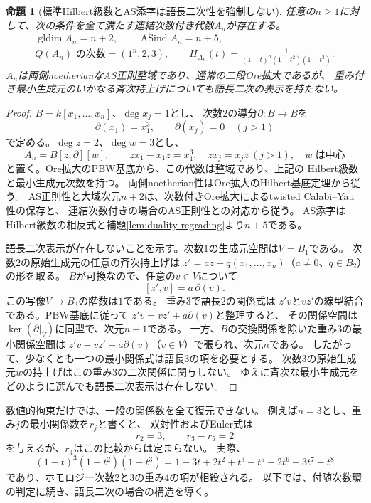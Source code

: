 \documentclass[11pt,a4paper]{ltjsarticle}
\newtheorem{proposition}[theorem]{命題}
\theoremstyle{definition}
\newcommand{\gldim}{\operatorname{gldim}}
\begin{document}
\begin{proposition}[標準Hilbert級数とAS添字は語長二次性を強制しない]\label{prop:nonquadratic-ore-family}
任意の$n\ge1$に対して、次の条件を全て満たす連結次数付き代数$A_n$が存在する。
\[
\begin{gathered}
\gldim A_n=n+2,\qquad \operatorname{ASind}A_n=n+5,\\
Q(A_n)\text{ の次数}=(1^n,2,3),\qquad
H_{A_n}(t)=\frac1{(1-t)^n(1-t^2)(1-t^3)}.
\end{gathered}
\]
$A_n$は両側noetherianなAS正則整域であり、通常の二段Ore拡大であるが、
重み付き最小生成元のいかなる斉次持上げについても語長二次の表示を持たない。
\end{proposition}
\begin{proof}
$B=k[x_1,\ldots,x_n]$、$\deg x_j=1$とし、
次数$2$の導分$\partial:B\to B$を
\[
\partial(x_1)=x_1^3,\qquad \partial(x_j)=0\quad(j>1)
\]
で定める。$\deg z=2$、$\deg w=3$とし、
\[
A_n=B[z;\partial][w],\qquad
zx_1-x_1z=x_1^3,\quad zx_j=x_jz\ (j>1),\quad w\text{ は中心}
\]
と置く。Ore拡大のPBW基底から、この代数は整域であり、上記の
Hilbert級数と最小生成元次数を持つ。
両側noetherian性はOre拡大のHilbert基底定理から従う。
AS正則性と大域次元$n+2$は、次数付きOre拡大によるtwisted
Calabi--Yau性の保存\cite[Theorem 3.3]{LWW}と、
連結次数付きの場合のAS正則性との対応から従う。
AS添字はHilbert級数の相反式と補題\ref{lem:duality-regrading}より$n+5$である。

語長二次表示が存在しないことを示す。次数$1$の生成元空間は$V=B_1$である。
次数$2$の原始生成元の任意の斉次持上げは
$z'=az+q(x_1,\ldots,x_n)$（$a\ne0$、$q\in B_2$）の形を取る。
$B$が可換なので、任意の$v\in V$について
\[
[z',v]=a\,\partial(v).
\]
この写像$V\to B_3$の階数は$1$である。
重み$3$で語長$2$の関係式は
$z'v$と$vz'$の線型結合である。PBW基底に従って
$z'v=vz'+a\partial(v)$と整理すると、
その関係空間は$\ker(\partial|_V)$に同型で、次元$n-1$である。
一方、$B$の交換関係を除いた重み$3$の最小関係空間は
$z'v-vz'-a\partial(v)$（$v\in V$）で張られ、次元$n$である。
したがって、少なくとも一つの最小関係式は語長$3$の項を必要とする。
次数$3$の原始生成元$w$の持上げはこの重み$3$の二次関係に関与しない。
ゆえに斉次な最小生成元をどのように選んでも語長二次表示は存在しない。
\end{proof}

数値的拘束だけでは、一般の関係数を全て復元できない。
例えば$n=3$とし、重み$j$の最小関係数を$r_j$と書くと、
双対性およびEuler式は
\[
r_2=3,\qquad r_3-r_5=2
\]
を与えるが、$r_4$はこの比較からは定まらない。
実際、
\[
(1-t)^3(1-t^2)(1-t^3)
=1-3t+2t^2+t^3-t^5-2t^6+3t^7-t^8
\]
であり、ホモロジー次数2と3の重み4の項が相殺される。
以下では、付随次数環の判定に続き、語長二次の場合の構造を導く。
\end{document}
